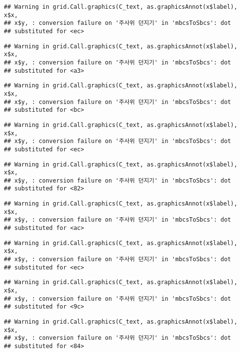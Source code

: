 \documentclass[]{book}
\begin{document}
\begin{verbatim}
## Warning in grid.Call.graphics(C_text, as.graphicsAnnot(x$label), x$x,
## x$y, : conversion failure on '주사위 던지기' in 'mbcsToSbcs': dot
## substituted for <ec>
\end{verbatim}

\begin{verbatim}
## Warning in grid.Call.graphics(C_text, as.graphicsAnnot(x$label), x$x,
## x$y, : conversion failure on '주사위 던지기' in 'mbcsToSbcs': dot
## substituted for <a3>
\end{verbatim}

\begin{verbatim}
## Warning in grid.Call.graphics(C_text, as.graphicsAnnot(x$label), x$x,
## x$y, : conversion failure on '주사위 던지기' in 'mbcsToSbcs': dot
## substituted for <bc>
\end{verbatim}

\begin{verbatim}
## Warning in grid.Call.graphics(C_text, as.graphicsAnnot(x$label), x$x,
## x$y, : conversion failure on '주사위 던지기' in 'mbcsToSbcs': dot
## substituted for <ec>
\end{verbatim}

\begin{verbatim}
## Warning in grid.Call.graphics(C_text, as.graphicsAnnot(x$label), x$x,
## x$y, : conversion failure on '주사위 던지기' in 'mbcsToSbcs': dot
## substituted for <82>
\end{verbatim}

\begin{verbatim}
## Warning in grid.Call.graphics(C_text, as.graphicsAnnot(x$label), x$x,
## x$y, : conversion failure on '주사위 던지기' in 'mbcsToSbcs': dot
## substituted for <ac>
\end{verbatim}

\begin{verbatim}
## Warning in grid.Call.graphics(C_text, as.graphicsAnnot(x$label), x$x,
## x$y, : conversion failure on '주사위 던지기' in 'mbcsToSbcs': dot
## substituted for <ec>
\end{verbatim}

\begin{verbatim}
## Warning in grid.Call.graphics(C_text, as.graphicsAnnot(x$label), x$x,
## x$y, : conversion failure on '주사위 던지기' in 'mbcsToSbcs': dot
## substituted for <9c>
\end{verbatim}

\begin{verbatim}
## Warning in grid.Call.graphics(C_text, as.graphicsAnnot(x$label), x$x,
## x$y, : conversion failure on '주사위 던지기' in 'mbcsToSbcs': dot
## substituted for <84>
\end{verbatim}
\end{document}
